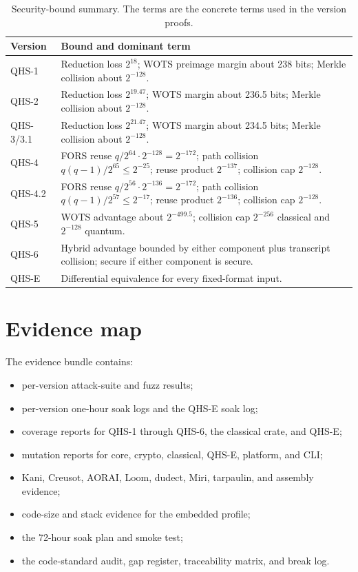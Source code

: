 \documentclass[11pt,a4paper]{article}
\theoremstyle{remark}
\begin{document}
\begin{table}[ht]
\centering
\caption{Security-bound summary. The terms are the concrete terms used in the
version proofs.}
\label{tab:boundsummary}
\small
\begin{tabularx}{\textwidth}{@{}l X@{}}
\toprule
Version & Bound and dominant term\\
\midrule
QHS-1 & Reduction loss \(2^{18}\); WOTS preimage margin about 238 bits; Merkle collision about \(2^{-128}\).\\
QHS-2 & Reduction loss \(2^{19.47}\); WOTS margin about 236.5 bits; Merkle collision about \(2^{-128}\).\\
QHS-3/3.1 & Reduction loss \(2^{21.47}\); WOTS margin about 234.5 bits; Merkle collision about \(2^{-128}\).\\
QHS-4 & FORS reuse \(q/2^{64}\cdot2^{-128}=2^{-172}\); path collision \(q(q-1)/2^{65}\le2^{-25}\); reuse product \(2^{-137}\); collision cap \(2^{-128}\).\\
QHS-4.2 & FORS reuse \(q/2^{56}\cdot2^{-136}=2^{-172}\); path collision \(q(q-1)/2^{57}\le2^{-17}\); reuse product \(2^{-136}\); collision cap \(2^{-128}\).\\
QHS-5 & WOTS advantage about \(2^{-499.5}\); collision cap \(2^{-256}\) classical and \(2^{-128}\) quantum.\\
QHS-6 & Hybrid advantage bounded by either component plus transcript collision; secure if either component is secure.\\
QHS-E & Differential equivalence for every fixed-format input.\\
\bottomrule
\end{tabularx}
\end{table}

\section{Evidence map}

The evidence bundle contains:

\begin{itemize}
  \item per-version attack-suite and fuzz results;
  \item per-version one-hour soak logs and the QHS-E soak log;
  \item coverage reports for QHS-1 through QHS-6, the classical crate, and QHS-E;
  \item mutation reports for core, crypto, classical, QHS-E, platform, and CLI;
  \item Kani, Creusot, AORAI, Loom, dudect, Miri, tarpaulin, and assembly evidence;
  \item code-size and stack evidence for the embedded profile;
  \item the 72-hour soak plan and smoke test;
  \item the code-standard audit, gap register, traceability matrix, and break log.
\end{itemize}
\end{document}

